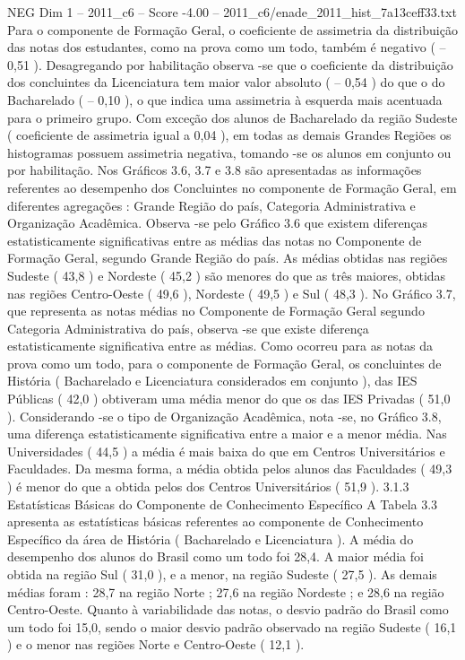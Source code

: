 \begin{textsample}{NEG Dim 1 – 2011\_c6 – Score -4.00 – 2011\_c6/enade\_2011\_hist\_7a13ceff33.txt}
Para o componente de Formação Geral, o coeficiente de assimetria da distribuição das notas dos estudantes, como na prova como um todo, também é negativo ( – 0,51 ).
Desagregando por habilitação observa -se que o coeficiente da distribuição dos concluintes da Licenciatura tem maior valor absoluto ( – 0,54 ) do que o do Bacharelado ( – 0,10 ), o que indica uma assimetria à esquerda mais acentuada para o primeiro grupo.
Com exceção dos alunos de Bacharelado da região Sudeste ( coeficiente de assimetria igual a 0,04 ), em todas as demais Grandes Regiões os histogramas possuem assimetria negativa, tomando -se os alunos em conjunto ou por habilitação.
Nos Gráficos 3.6, 3.7 e 3.8 são apresentadas as informações referentes ao desempenho dos Concluintes no componente de Formação Geral, em diferentes agregações : Grande Região do país, Categoria Administrativa e Organização Acadêmica.
Observa -se pelo Gráfico 3.6 que existem diferenças estatisticamente significativas entre as médias das notas no Componente de Formação Geral, segundo Grande Região do país.
As médias obtidas nas regiões Sudeste ( 43,8 ) e Nordeste ( 45,2 ) são menores do que as três maiores, obtidas nas regiões Centro-Oeste ( 49,6 ), Nordeste ( 49,5 ) e Sul ( 48,3 ).
No Gráfico 3.7, que representa as notas médias no Componente de Formação Geral segundo Categoria Administrativa do país, observa -se que existe diferença estatisticamente significativa entre as médias.
Como ocorreu para as notas da prova como um todo, para o componente de Formação Geral, os concluintes de História ( Bacharelado e Licenciatura considerados em conjunto ), das IES Públicas ( 42,0 ) obtiveram uma média menor do que os das IES Privadas ( 51,0 ).
Considerando -se o tipo de Organização Acadêmica, nota -se, no Gráfico 3.8, uma diferença estatisticamente significativa entre a maior e a menor média.
Nas Universidades ( 44,5 ) a média é mais baixa do que em Centros Universitários e Faculdades.
Da mesma forma, a média obtida pelos alunos das Faculdades ( 49,3 ) é menor do que a obtida pelos dos Centros Universitários ( 51,9 ). 3.1.3 Estatísticas Básicas do Componente de Conhecimento Específico A Tabela 3.3 apresenta as estatísticas básicas referentes ao componente de Conhecimento Específico da área de História ( Bacharelado e Licenciatura ).
A média do desempenho dos alunos do Brasil como um todo foi 28,4.
A maior média foi obtida na região Sul ( 31,0 ), e a menor, na região Sudeste ( 27,5 ).
As demais médias foram : 28,7 na região Norte ; 27,6 na região Nordeste ; e 28,6 na região Centro-Oeste.
Quanto à variabilidade das notas, o desvio padrão do Brasil como um todo foi 15,0, sendo o maior desvio padrão observado na região Sudeste ( 16,1 ) e o menor nas regiões Norte e Centro-Oeste ( 12,1 ).

\end{textsample}
